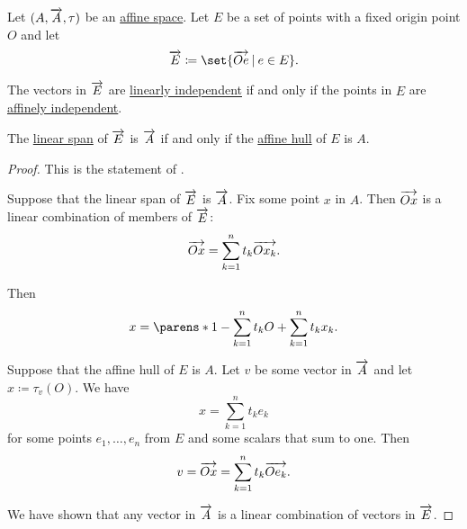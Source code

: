 \begin{proposition}\label{thm:linear_and_affine_bases}
  Let \( (A, \overrightarrow{A}, \tau) \) be an \hyperref[def:affine_space]{affine space}. Let \( E \) be a set of points with a fixed origin point \( O \) and let
  \begin{equation*}
    \vect E \coloneqq \set{ \vect{Oe} \given e \in E }.
  \end{equation*}

  \begin{thmenum}
     The vectors in \( \overrightarrow{E} \) are \hyperref[def:linear_dependence]{linearly independent} if and only if the points in \( E \) are \hyperref[def:affine_dependence]{affinely independent}.

     The \hyperref[def:semimodule/submodel]{linear span} of \( \overrightarrow{E} \) is \( \overrightarrow{A} \) if and only if the \hyperref[def:affine_hull]{affine hull} of \( E \) is \( A \).
  \end{thmenum}
\end{proposition}
\begin{proof}
   This is the statement of .

  \SufficiencySubProof* Suppose that the linear span of \( \overrightarrow{E} \) is \( \overrightarrow{A} \). Fix some point \( x \) in \( A \). Then \( \overrightarrow{Ox} \) is a linear combination of members of \( \overrightarrow{E} \):
  \begin{equation*}
    \overrightarrow{Ox} = \sum_{k=1}^n t_k \overrightarrow{O x_k}.
  \end{equation*}

  Then
  \begin{equation*}
    x = \parens*{ 1 - \sum_{k=1}^n t_k } O + \sum_{k=1}^n t_k x_k.
  \end{equation*}

  \NecessitySubProof* Suppose that the affine hull of \( E \) is \( A \). Let \( v \) be some vector in \( \overrightarrow{A} \) and let \( x \coloneqq \tau_v(O) \). We have
  \begin{equation*}
    x = \sum_{k=1}^n t_k e_k
  \end{equation*}
  for some points \( e_1, \ldots, e_n \) from \( E \) and some scalars that sum to one. Then
  \begin{equation*}
    v = \overrightarrow{Ox} = \sum_{k=1}^n t_k \overrightarrow{O e_k}.
  \end{equation*}

  We have shown that any vector in \( \overrightarrow{A} \) is a linear combination of vectors in \( \overrightarrow{E} \).
\end{proof}

